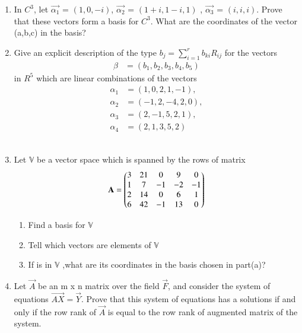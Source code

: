 \begin{enumerate}[label=\thesubsection.\arabic*.,ref=\thesubsection.\theenumi]
%
%
\solution

%
\item In $C^3$, let $\vec{\alpha_1}$ = $(1,0,-i)$, $\vec{\alpha_2}$ = $(1+i,1-i,1)$ , $\vec{\alpha_3}$ = $(i,i,i)$. Prove that these vectors form a basis for $C^3$. What are the coordinates of the vector (a,b,c) in the basis?
%
\\
\solution

\item Give an explicit description of the type $b_j=\sum_{i=1}^{r} b_{ki}R_{ij}$ for the vectors
\begin{align}
    \beta &= (b_1,b_2,b_3,b_4,b_5) \nonumber
\end{align}
in $R^5$ which are linear combinations of the vectors
\begin{align}
    \alpha_1 &= (1,0,2,1,-1), \\
    \alpha_2 &= (-1,2,-4,2,0), \\
    \alpha_3 &= (2,-1,5,2,1), \\
    \alpha_4 &= (2,1,3,5,2)
\end{align}
%
\\
\solution

%
\item Let $\mathbb{V}$ be a vector space which is spanned by the rows of matrix
\begin{align}
    \mathbf{A} = \begin{pmatrix}3&21&0&9&0\\1&7&-1&-2&-1\\2&14&0&6&1\\6&42&-1&13&0\end{pmatrix}\label{eq:solutions/2/5/6/eq:mat}
\end{align}
\begin{enumerate}[label=\alph*.]
\item Find a basis for $\mathbb{V}$
\item Tell which vectors  are elements of $\mathbb{V}$ 
\item If  is in $\mathbb{V}$ ,what are its coordinates in the basis chosen in part(a)?
\end{enumerate}
%
\solution

\item Let $\vec{A}$ be an m x n matrix over the field $\vec{F}$, and consider the system of equations $\vec{AX}=\vec{Y}$. Prove that this system of equations has a solutions if and only if the row rank of $\vec{A}$ is equal to the row rank of augmented matrix of the system. 
%
\solution


\end{enumerate}
